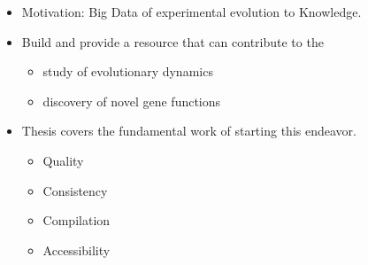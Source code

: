\documentclass[12pt,final,masters,chapterheads]{ucsd}  %
\begin{document}
\begin{itemize}
\item Motivation: Big Data of experimental evolution to Knowledge.
\item Build and provide a resource that can contribute to the
\begin{itemize}
\item study of evolutionary dynamics
\item discovery of novel gene functions
\end{itemize}
\item Thesis covers the fundamental work of starting this endeavor.
\begin{itemize}
\item Quality
\item Consistency
\item Compilation
\item Accessibility
\end{itemize}

\end{itemize}
\end{document}
